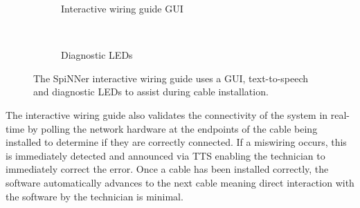 \begin{figure}
\begin{subfigure}[b]{0.546\textwidth}
					\caption{Interactive wiring guide GUI}
					\label{fig:interactive-wiring-guide-gui}
				\end{subfigure}
				~
				\begin{subfigure}[b]{0.40\textwidth}
					
					\caption{Diagnostic LEDs}
					\label{fig:interactive-wiring-guide-leds}
				\end{subfigure}
				
				\caption{The SpiNNer interactive wiring guide uses a GUI,
				text-to-speech and diagnostic LEDs to assist during cable
				installation.}
				\label{fig:interactive-wiring-guide}
			\end{figure}
			
			The interactive wiring guide also validates the connectivity of the
			system in real-time by polling the network hardware at the endpoints of
			the cable being installed to determine if they are correctly connected.
			If a miswiring occurs, this is immediately detected and announced via TTS
			enabling the technician to immediately correct the error. Once a cable
			has been installed correctly, the software automatically advances to the
			next cable meaning direct interaction with the software by the technician
			is minimal.
		
